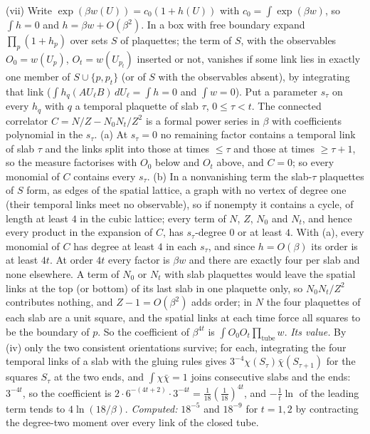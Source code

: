 (vii) Write $\exp(\beta w(U)) = c_0(1 + h(U))$ with $c_0 = \int\exp(\beta w)$, so $\int h = 0$ and $h = \beta w + O(\beta^2)$. In a box with free boundary expand $\prod_p(1 + h_p)$ over sets $S$ of plaquettes; the term of $S$, with the observables $O_0 = w(U_p)$, $O_t = w(U_{p_t})$ inserted or not, vanishes if some link lies in exactly one member of $S \cup \{p, p_t\}$ (or of $S$ with the observables absent), by integrating that link ($\int h_q(AU_\ell B)\,dU_\ell = \int h = 0$ and $\int w = 0$). Put a parameter $s_\tau$ on every $h_q$ with $q$ a temporal plaquette of slab $\tau$, $0 \le \tau < t$. The connected correlator $C = N/Z - N_0N_t/Z^2$ is a formal power series in $\beta$ with coefficients polynomial in the $s_\tau$. (a) At $s_\tau = 0$ no remaining factor contains a temporal link of slab $\tau$ and the links split into those at times $\le \tau$ and those at times $\ge \tau + 1$, so the measure factorises with $O_0$ below and $O_t$ above, and $C = 0$; so every monomial of $C$ contains every $s_\tau$. (b) In a nonvanishing term the slab-$\tau$ plaquettes of $S$ form, as edges of the spatial lattice, a graph with no vertex of degree one (their temporal links meet no observable), so if nonempty it contains a cycle, of length at least $4$ in the cubic lattice; every term of $N$, $Z$, $N_0$ and $N_t$, and hence every product in the expansion of $C$, has $s_\tau$-degree $0$ or at least $4$. With (a), every monomial of $C$ has degree at least $4$ in each $s_\tau$, and since $h = O(\beta)$ its order is at least $4t$. At order $4t$ every factor is $\beta w$ and there are exactly four per slab and none elsewhere. A term of $N_0$ or $N_t$ with slab plaquettes would leave the spatial links at the top (or bottom) of its last slab in one plaquette only, so $N_0N_t/Z^2$ contributes nothing, and $Z - 1 = O(\beta^2)$ adds order; in $N$ the four plaquettes of each slab are a unit square, and the spatial links at each time force all squares to be the boundary of $p$. So the coefficient of $\beta^{4t}$ is $\int O_0O_t\prod_{\mathrm{tube}}w$. \emph{Its value.} By (iv) only the two consistent orientations survive; for each, integrating the four temporal links of a slab with the gluing rules gives $3^{-4}\chi(S_\tau)\bar\chi(S_{\tau+1})$ for the squares $S_\tau$ at the two ends, and $\int\chi\bar\chi = 1$ joins consecutive slabs and the ends: $3^{-4t}$, so the coefficient is $2\cdot6^{-(4t+2)}\cdot3^{-4t} = \tfrac1{18}(\tfrac1{18})^{4t}$, and $-\tfrac1t\ln$ of the leading term tends to $4\ln(18/\beta)$. \emph{Computed:} $18^{-5}$ and $18^{-9}$ for $t = 1, 2$ by contracting the degree-two moment over every link of the closed tube.

